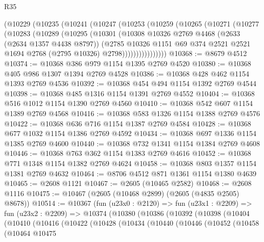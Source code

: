 \begin{lexlean}{R35}
\begin{coremodule}
      (@10229
        (@10235
          (@10241
            (@10247
              (@10253
                (@10259
                  (@10265
                    (@10271
                      (@10277
                        (@10283
                          (@10289
                            (@10295
                              (@10301
                                (@10308
                                  @10326
                                  @2769
                                  @4468
                                  (@2633 (@2634 @1357 @4438 @8797))
                                  (@2785
                                    @10326
                                    @1151
                                    @69
                                    @374
                                    @2521
                                    @2521
                                    @1694
                                    @2768
                                    (@2795 @10326)
                                    @2798))))))))))))))))
@10368 := @8679 @4512
@10374 := @10368 @386 @979 @1154 @1395 @2769 @4520
@10380 := @10368 @405 @986 @1307 @1394 @2769 @4528
@10386 := @10368 @428 @462 @1154 @1393 @2769 @4536
@10392 := @10368 @454 @494 @1154 @1392 @2769 @4544
@10398 := @10368 @485 @1316 @1154 @1391 @2769 @4552
@10404 := @10368 @516 @1012 @1154 @1390 @2769 @4560
@10410 := @10368 @542 @607 @1154 @1389 @2769 @4568
@10416 := @10368 @583 @1326 @1154 @1388 @2769 @4576
@10422 := @10368 @636 @716 @1154 @1387 @2769 @4584
@10428 := @10368 @677 @1032 @1154 @1386 @2769 @4592
@10434 := @10368 @697 @1336 @1154 @1385 @2769 @4600
@10440 := @10368 @732 @1341 @1154 @1384 @2769 @4608
@10446 := @10368 @763 @362 @1154 @1383 @2769 @4616
@10452 := @10368 @771 @1348 @1154 @1382 @2769 @4624
@10458 := @10368 @803 @1357 @1154 @1381 @2769 @4632
@10464 := @8706 @4512 @871 @1361 @1154 @1380 @4639
@10465 := @2608 @1121
@10467 := @2605 (@10465 @2582)
@10468 := @2608 @1116
@10475 := @10467 (@2605 (@10468 @2899) (@2605 (@4835 @2505) @8678))
@10514 := @10367
    (fun (u23x0 : @2120) =>
    fun (u23x1 : @2209) =>
    fun (u23x2 : @2209) =>
    @10374
      (@10380
        (@10386
          (@10392
            (@10398
              (@10404
                (@10410
                  (@10416
                    (@10422
                      (@10428
                        (@10434
                          (@10440
                            (@10446
                              (@10452
                                (@10458
                                  (@10464
                                    @10475

\end{coremodule}
\end{lexlean}
